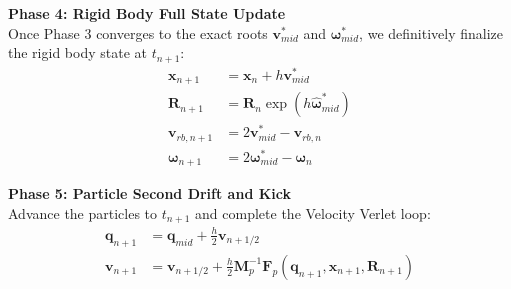 \textbf{Phase 4: Rigid Body Full State Update}\\
Once Phase 3 converges to the exact roots $\mathbf{v}_{mid}^*$ and $\boldsymbol{\omega}_{mid}^*$, we definitively finalize the rigid body state at $t_{n+1}$:
\begin{align}
    \mathbf{x}_{n+1} &= \mathbf{x}_n + h \mathbf{v}_{mid}^* \\
    \mathbf{R}_{n+1} &= \mathbf{R}_n \exp\left( h \widehat{\boldsymbol{\omega}}_{mid}^* \right) \\
    \mathbf{v}_{rb, n+1} &= 2\mathbf{v}_{mid}^* - \mathbf{v}_{rb, n} \\
    \boldsymbol{\omega}_{n+1} &= 2\boldsymbol{\omega}_{mid}^* - \boldsymbol{\omega}_n
\end{align}

\textbf{Phase 5: Particle Second Drift and Kick}\\
Advance the particles to $t_{n+1}$ and complete the Velocity Verlet loop:
\begin{align}
    \mathbf{q}_{n+1} &= \mathbf{q}_{mid} + \frac{h}{2} \mathbf{v}_{n+1/2} \\
    \mathbf{v}_{n+1} &= \mathbf{v}_{n+1/2} + \frac{h}{2} \mathbf{M}_p^{-1} \mathbf{F}_p(\mathbf{q}_{n+1}, \mathbf{x}_{n+1}, \mathbf{R}_{n+1})
\end{align}

